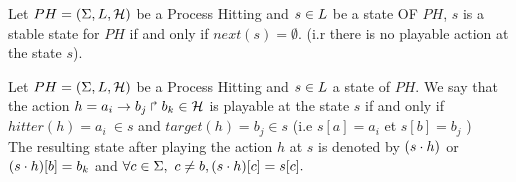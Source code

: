 \begin{definition}[Reachability]
\label{def:Reachability}
Let $PH = (\Sigma,L,\mathcal{H})$ be a Process Hitting and
$s \in L$ be a state OF $PH$, $s$ is a stable state for $PH$ if and only if $next(s) = \emptyset $. (i.r there is no playable action at the state $s$).
\end{definition}

\begin{definition} 
\label{def:playableAction}
Let $PH = (\Sigma,L,\mathcal{H})$ be a Process Hitting and $s \in L$ a state of $PH$. We say that the action $h = a_i\rightarrow b_j\Rsh b_k \in \mathcal{H}$ is playable at the state $s$ if and only if $hitter(h)=a_i ~ \in s$ and $target(h)=b_j \in s$ (i.e $s[a]=a_i$ et $s[b]=b_j$ ) \\
The resulting state after playing the action $h$ at $s$ is denoted by $(s \cdot h)$ or $(s \cdot h)[b]=b_k$ and $\forall c \in \Sigma, ~ c \neq b, (s \cdot h)[c]=s[c].$
\end{definition}
